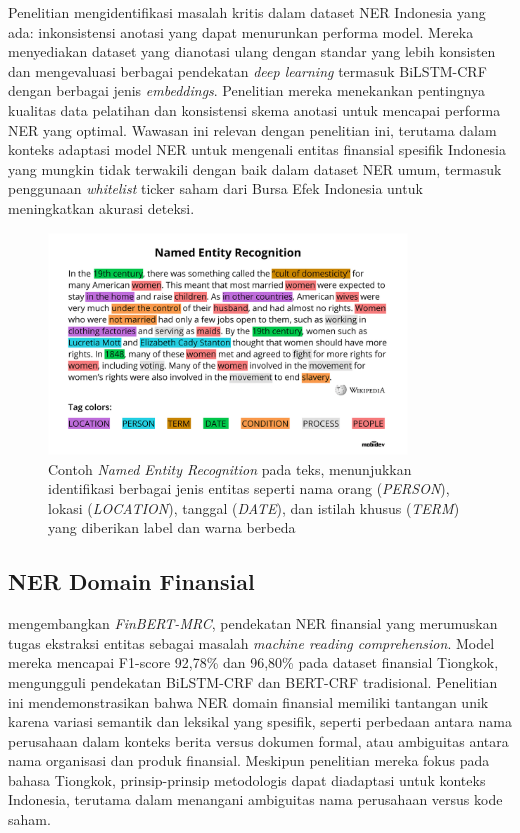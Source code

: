 Penelitian \textcite{khairunnisa2020} mengidentifikasi masalah kritis dalam dataset NER Indonesia yang ada: inkonsistensi anotasi yang dapat menurunkan performa model. Mereka menyediakan dataset yang dianotasi ulang dengan standar yang lebih konsisten dan mengevaluasi berbagai pendekatan \textit{deep learning} termasuk BiLSTM-CRF dengan berbagai jenis \textit{embeddings}. Penelitian mereka menekankan pentingnya kualitas data pelatihan dan konsistensi skema anotasi untuk mencapai performa NER yang optimal. Wawasan ini relevan dengan penelitian ini, terutama dalam konteks adaptasi model NER untuk mengenali entitas finansial spesifik Indonesia yang mungkin tidak terwakili dengan baik dalam dataset NER umum, termasuk penggunaan \textit{whitelist} ticker saham dari Bursa Efek Indonesia untuk meningkatkan akurasi deteksi.

\begin{figure}[H]
  \centering
  \includegraphics[width=0.85\textwidth]{image/ner-example.png}
  \caption{Contoh \textit{Named Entity Recognition} pada teks, menunjukkan identifikasi berbagai jenis entitas seperti nama orang (\textit{PERSON}), lokasi (\textit{LOCATION}), tanggal (\textit{DATE}), dan istilah khusus (\textit{TERM}) yang diberikan label dan warna berbeda}
  \label{fig:ner-example}
\end{figure}

\subsection{NER Domain Finansial}

\textcite{zhang2022finbert} mengembangkan \textit{FinBERT-MRC}, pendekatan NER finansial yang merumuskan tugas ekstraksi entitas sebagai masalah \textit{machine reading comprehension}. Model mereka mencapai F1-score 92,78\% dan 96,80\% pada dataset finansial Tiongkok, mengungguli pendekatan BiLSTM-CRF dan BERT-CRF tradisional. Penelitian ini mendemonstrasikan bahwa NER domain finansial memiliki tantangan unik karena variasi semantik dan leksikal yang spesifik, seperti perbedaan antara nama perusahaan dalam konteks berita versus dokumen formal, atau ambiguitas antara nama organisasi dan produk finansial. Meskipun penelitian mereka fokus pada bahasa Tiongkok, prinsip-prinsip metodologis dapat diadaptasi untuk konteks Indonesia, terutama dalam menangani ambiguitas nama perusahaan versus kode saham.

